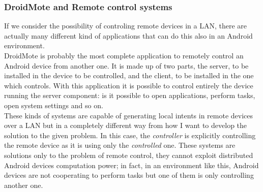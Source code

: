 \subsubsection{DroidMote and Remote control systems}
If we consider the possibility of controling remote devices in a LAN, there are actually many different kind of applications that can do this also in an Android environment.\\
DroidMote is probably the most complete application to remotely control an Android device from another one. It is made up of two parts, the server, to be installed in the device to be controlled, and the client, to be installed in the one which controls. With this application it is possible to control entirely the device running the server component: is it possible to open applications, perform tasks, open system settings and so on.\\
These kinds of systems are capable of generating local intents in remote devices over a LAN but in a completely different way from how I want to develop the solution to the given problem. In this case, the \textit{controller} is explicitly controlling the remote device as it is using only the \textit{controlled} one. These systems are solutions only to the problem of remote control, they cannot exploit distributed Android devices computation power; in fact, in an environment like this, Android devices are not cooperating to perform tasks but one of them is only controlling another one.






%
